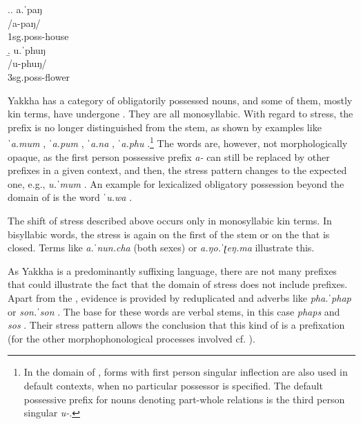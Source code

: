 \ex.\a. \glll a.ˈpaŋ\\
/a-paŋ/\\
{\sc 1sg.poss-}house\\
\b. \glll u.ˈphuŋ\\
/u-phuŋ/\\
{\sc 3sg.poss-}flower\\


Yakkha has a category of obligatorily possessed nouns, and some of them, mostly kin terms, have undergone  . They are all monosyllabic. With regard to  stress, the prefix is no longer distinguished from the stem, as shown by examples like \emph{ˈa.mum} , \emph{ˈa.pum} , \emph{ˈa.na} , \emph{ˈa.phu} .\footnote{In the domain of , forms with first person singular inflection are also used in default contexts, when no particular possessor is specified. The default possessive prefix for nouns denoting part-whole relations is the third person singular \emph{u-}.} The words are, however, not morphologically opaque, as the first person possessive prefix \emph{a-} can still be replaced by other prefixes in a given context, and then, the stress pattern changes to the expected one, e.g., \emph{u.ˈmum} . An example for lexicalized obligatory possession beyond the domain of  is the word \emph{ˈu.wa} .

The shift of stress described above occurs only in monosyllabic kin terms. In bisyllabic words, the stress is again on the first   of the stem or on the  that is closed. Terms like \emph{a.ˈnun.cha}  (both sexes) or \emph{a.ŋo.ˈʈeŋ.ma}  illustrate this.


As Yakkha is a predominantly suffixing language, there are not many prefixes that could illustrate the fact that the domain of stress does not include prefixes. Apart from the , evidence is provided by reduplicated  and adverbs like \emph{pha.ˈphap}  or \emph{son.ˈson} . The base for these words are verbal stems, in this case \emph{phaps}  and \emph{sos} . Their stress pattern allows the conclusion that this kind of  is a prefixation (for the other morphophonological processes involved cf. ).



